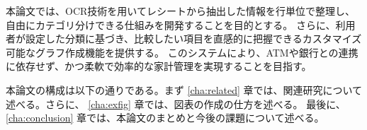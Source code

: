 \documentclass[main]{subfiles}
\begin{document}
本論文では、OCR技術を用いてレシートから抽出した情報を行単位で整理し、自由にカテゴリ分けできる仕組みを開発することを目的とする。
さらに、利用者が設定した分類に基づき、比較したい項目を直感的に把握できるカスタマイズ可能なグラフ作成機能を提供する。
このシステムにより、ATMや銀行との連携に依存せず、かつ柔軟で効率的な家計管理を実現することを目指す。

本論文の構成は以下の通りである。まず \ref{cha:related} 章では、関連研究について述べる。さらに、
\ref{cha:exfig} 章では、図表の作成の仕方を述べる。
最後に、\ref{cha:conclusion} 章では、本論文のまとめと今後の課題について述べる。
\end{document}

